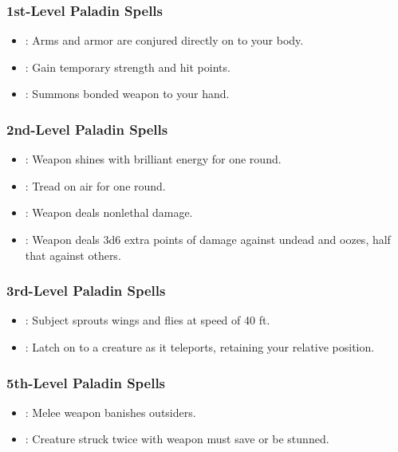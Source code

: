 \subsubsection{1st-Level Paladin Spells}
\begin{itemize}
 \item {}: Arms and armor are conjured directly on to your body.
 \item {}: Gain temporary strength and hit points.
 \item {}: Summons bonded weapon to your hand.
\end{itemize}
\subsubsection{2nd-Level Paladin Spells}
\begin{itemize}
 \item {}: Weapon shines with brilliant energy for one round.
 \item {}: Tread on air for one round.
 \item {}: Weapon deals nonlethal damage.
 \item {}: Weapon deals 3d6 extra points of damage against undead and oozes, half that against others.
\end{itemize}
\subsubsection{3rd-Level Paladin Spells}
\begin{itemize}
 \item {}: Subject sprouts wings and flies at speed of 40 ft.
 \item {}: Latch on to a creature as it teleports, retaining your relative position.
\end{itemize}
\subsubsection{5th-Level Paladin Spells}
\begin{itemize}
 \item {}: Melee weapon banishes outsiders.
 \item {}: Creature struck twice with weapon must save or be stunned.
\end{itemize}
